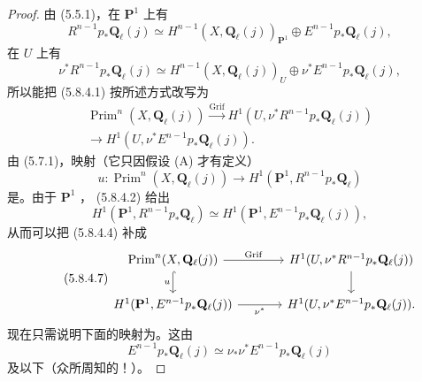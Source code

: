 \begin{proof}
由 (5.5.1)，在 $\mathbf P^1$ 上有
\begin{equation}\tag{5.8.4.2}R^{n-1}p_*\mathbf Q_\ell(j)\simeq H^{n-1}(X,\mathbf Q_\ell(j))_{\mathbf P^1}\oplus E^{n-1}p_*\mathbf Q_\ell(j),\end{equation}
在 $U$ 上有
\begin{equation}\tag{5.8.4.3}\nu^*R^{n-1}p_*\mathbf Q_\ell(j)\simeq H^{n-1}(X,\mathbf Q_\ell(j))_U\oplus\nu^*E^{n-1}p_*\mathbf Q_\ell(j),\end{equation}
所以能把 (5.8.4.1) 按所述方式改写为
\begin{equation}\tag{5.8.4.4}\begin{gathered}
\operatorname{Prim}^n(X,\mathbf Q_\ell(j))\xrightarrow{\operatorname{Grif}}H^1(U,\nu^*R^{n-1}p_*\mathbf Q_\ell(j))\\
\longrightarrow H^1(U,\nu^*E^{n-1}p_*\mathbf Q_\ell(j)).
\end{gathered}\end{equation}
由 (5.7.1)，映射（它只因假设 (A) 才有定义）
\begin{equation}\tag{5.8.4.5}u:\operatorname{Prim}^n(X,\mathbf Q_\ell(j))\longrightarrow H^1(\mathbf P^1,R^{n-1}p_*\mathbf Q_\ell)\end{equation}
是。由于 $\mathbf P^1$ ， (5.8.4.2) 给出
\begin{equation}\tag{5.8.4.6}H^1(\mathbf P^1,R^{n-1}p_*\mathbf Q_\ell)\simeq H^1(\mathbf P^1,E^{n-1}p_*\mathbf Q_\ell(j)),\end{equation}
从而可以把 (5.8.4.4) 补成
\begin{equation}\tag{5.8.4.7}
\begin{tikzcd}[column sep=large]
\operatorname{Prim}^n(X,\mathbf Q_\ell(j))\arrow[r,"\operatorname{Grif}"]\arrow[d,"u"',hook]&H^1(U,\nu^*R^{n-1}p_*\mathbf Q_\ell(j))\arrow[d]\\
H^1(\mathbf P^1,E^{n-1}p_*\mathbf Q_\ell(j))\arrow[r,"\nu^*"']&H^1(U,\nu^*E^{n-1}p_*\mathbf Q_\ell(j)).
\end{tikzcd}
\end{equation}
现在只需说明下面的映射为。这由
\begin{equation}\tag{5.8.4.8}E^{n-1}p_*\mathbf Q_\ell(j)\simeq\nu_*\nu^*E^{n-1}p_*\mathbf Q_\ell(j)\end{equation}
及以下（众所周知的！）。
\end{proof}
